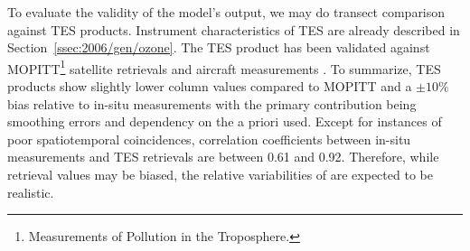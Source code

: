 To evaluate the validity of the model's  output, we may do transect comparison against TES  products. Instrument characteristics of TES are
already described in Section~\ref{ssec:2006/gen/ozone}. The TES  product has been validated against MOPITT\footnote{Measurements of Pollution in
the Troposphere.} satellite retrievals \citep{Luo:2007ly,Ho:2009lh} and aircraft measurements \citep{Luo:2007vn,Lopez:2008ys}. To summarize, TES 
products show slightly lower column  values compared to MOPITT and a $\pm10\%$ bias relative to in-situ measurements with
the primary contribution being smoothing errors and dependency on the a priori used. Except for instances of poor spatiotemporal coincidences, correlation
coefficients between in-situ measurements and TES retrievals are between 0.61 and 0.92. Therefore, while retrieval values may be biased, the relative variabilities
of   are expected to be realistic.

